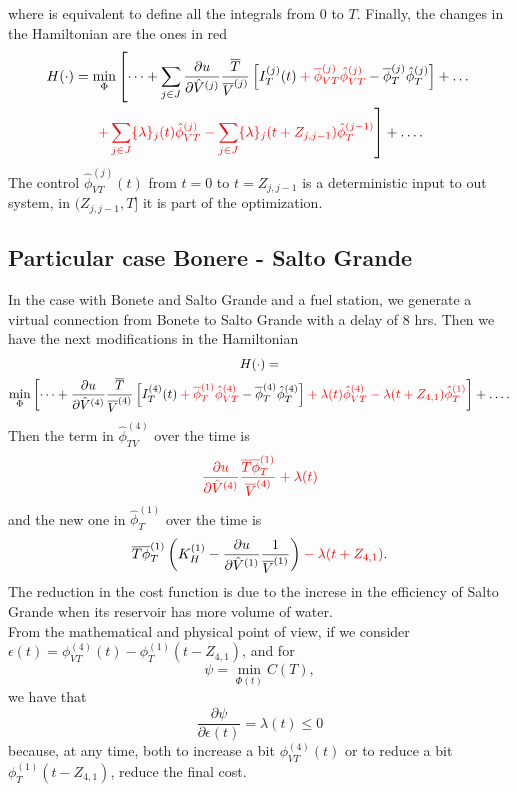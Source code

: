 \documentclass[12pt]{article}
\theoremstyle{definition}
\theoremstyle{remark}
\begin{document}
where is equivalent to define all the integrals from $0$ to $T$. Finally, the changes in the Hamiltonian are the ones in red
\begin{multline*}
H(\cdot)=\min_\Phi\left[\dots+\sum_{j\in J}\frac{\partial u}{\partial\hat{V}^{(j)}}\frac{\overline{T}}{\overline{V}^{(j)}}\left[I_T^{(j)}(t)\color{red}+\overline{\phi}_{VT}^{(j)}\hat{\phi}_{VT}^{(j)}\color{black}-\overline{\phi}_T^{(j)}\hat{\phi}_T^{(j)}\right]+\dots\right.\\
\left.\color{red}+\sum_{j\in J}\{\lambda\}_j(t)\hat{\phi}_{VT}^{(j)}-\sum_{j\in J}\{{\lambda}\}_j(t+Z_{j,j-1})\hat{\phi}_T^{(j-1)}\color{black}\right]+\dots.
\end{multline*}
The control $\hat{\phi}_{VT}^{(j)}(t)$ from $t=0$ to $t=Z_{j,j-1}$ is a deterministic input to out system, in $(Z_{j,j-1},T]$ it is part of the optimization.

\subsection{Particular case Bonere - Salto Grande}

In the case with Bonete and Salto Grande and a fuel station, we generate a virtual connection from Bonete to Salto Grande with a delay of 8 hrs. Then we have the next modifications in the Hamiltonian
\begin{multline*}
H(\cdot)=\\
\min_\Phi\left[\dots+\frac{\partial u}{\partial\hat{V}^{(4)}}\frac{\overline{T}}{\overline{V}^{(4)}}\left[I_T^{(4)}(t)\color{red}+\overline{\phi}_T^{(1)}\hat{\phi}_{VT}^{(4)}\color{black}-\overline{\phi}_T^{(4)}\hat{\phi}_T^{(4)}\right]\color{red}+\lambda(t)\hat{\phi}_{VT}^{(4)}-{\lambda}(t+Z_{4,1})\hat{\phi}_T^{(1)}\color{black}\right]+\dots.
\end{multline*}
Then the term in $\hat{\phi}^{(4)}_{TV}$ over the time is
\begin{equation*}
\color{red}\frac{\partial u}{\partial\hat{V}^{(4)}}\frac{\overline{T}\overline{\phi}^{(1)}_T}{\overline{V}^{(4)}}+\lambda(t)
\end{equation*}
and the new one in $\hat{\phi}_T^{(1)}$ over the time is
\begin{equation*}
\overline{T}\overline{\phi}_T^{(1)}\left(K_H^{(1)}-\frac{\partial u}{\partial\hat{V}^{(1)}}\frac{1}{\overline{V}^{(1)}}\right)\color{red}-{\lambda}(t+Z_{4,1})\color{black}.
\end{equation*}
The reduction in the cost function is due to the increse in the efficiency of Salto Grande when its reservoir has more volume of water.\\
From the mathematical and physical point of view, if we consider $\epsilon(t)=\phi_{VT}^{(4)}(t)-\phi_{T}^{(1)}(t-Z_{4,1})$, and for
\begin{equation*}
\psi=\min_{\Phi(t)}C(T),
\end{equation*}
we have that
\begin{equation*}
\frac{\partial\psi}{\partial\epsilon(t)}=\lambda(t)\leq0
\end{equation*}
because, at any time, both to increase a bit $\phi_{VT}^{(4)}(t)$ or to reduce a bit $\phi_{T}^{(1)}(t-Z_{4,1})$, reduce the final cost.
\end{document}
